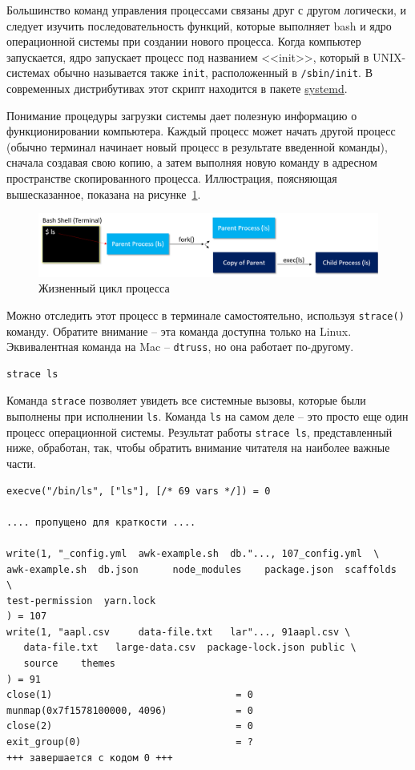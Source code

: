 \documentclass[a4paper,12pt,final,openany]{extbook}
\begin{document}
Большинство команд управления процессами связаны друг с другом логически, и следует
изучить последовательность функций, которые выполняет bash и
ядро операционной системы при создании нового процесса. Когда компьютер
запускается, ядро запускает процесс под названием <<init>>, который в
UNIX-системах обычно называется также \texttt{init}, расположенный в
\texttt{/sbin/init}. В современных дистрибутивах этот скрипт находится в пакете \href{https://en.wikipedia.org/wiki/Systemd}{systemd}.

Понимание процедуры загрузки системы дает полезную информацию о функционировании компьютера.
Каждый процесс может начать другой процесс
(обычно терминал начинает новый процесс в результате введенной команды),
сначала создавая свою копию, а затем выполняя новую команду в адресном пространстве скопированного процесса. Иллюстрация, поясняющая
вышесказанное, показана на рисунке~\ref{fig:proclc}.
\begin{figure}[tbh]
  \centering

  \includegraphics[width=\linewidth]{blog/2019/bash-essentials/processes-linux.png}
  \caption{Жизненный цикл процесса}
  \label{fig:proclc}
\end{figure}

Можно отследить этот процесс в терминале самостоятельно, используя
\texttt{strace()} команду. Обратите внимание -- эта команда доступна
только на Linux. Эквивалентная команда на Mac -- \texttt{dtruss}, но она
работает по-другому.
\begin{verbatim}
strace ls
\end{verbatim}

Команда \texttt{strace} позволяет увидеть все системные вызовы, которые были
выполнены при исполнении \texttt{ls}. Команда \texttt{ls} на самом деле --
это просто еще один процесс операционной системы. Результат работы
\texttt{strace\ ls}, представленный ниже, обработан, так, чтобы обратить
внимание читателя на наиболее важные части.

\begin{verbatim}
execve("/bin/ls", ["ls"], [/* 69 vars */]) = 0

.... пропущено для краткости ....

write(1, "_config.yml  awk-example.sh  db."..., 107_config.yml  \
awk-example.sh  db.json      node_modules    package.json  scaffolds  \
test-permission  yarn.lock
) = 107
write(1, "aapl.csv     data-file.txt   lar"..., 91aapl.csv \
   data-file.txt   large-data.csv  package-lock.json public \
   source    themes
) = 91
close(1)                                = 0
munmap(0x7f1578100000, 4096)            = 0
close(2)                                = 0
exit_group(0)                           = ?
+++ завершается с кодом 0 +++
\end{verbatim}
\end{document}
